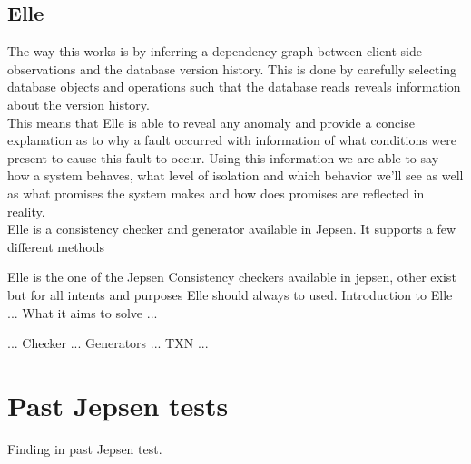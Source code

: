 \documentclass[a4paper,10pt,titlepage]{report}
\begin{document}
\subsection{Elle}


The way this works is by inferring a dependency graph between client side observations and the database version history. This is done by carefully selecting database objects and operations such that the database reads reveals information about the version history.\\
\vspace{5mm}
This means that Elle is able to reveal any anomaly and provide a concise explanation as to why a fault occurred with information of what conditions were present to cause this fault to occur. Using this information we are able to say how a system behaves, what level of isolation and which behavior we'll see as well as what promises the system makes and how does promises are reflected in reality.\\


Elle is a consistency checker and generator available in Jepsen. It supports a few different methods 

Elle is the one of the Jepsen Consistency checkers available in jepsen, other exist but for all intents and purposes Elle should always to used. 
Introduction to Elle
...
What it aims to solve
...

...
Checker
...
Generators
...
TXN
...










\section{Past Jepsen tests}
    Finding in past Jepsen test.
\end{document}
